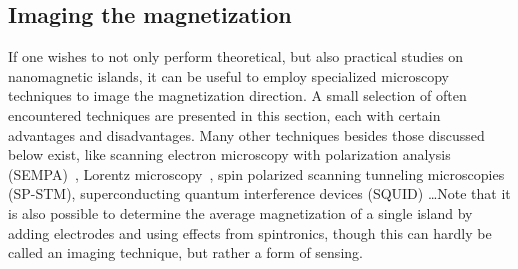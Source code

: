 \documentclass[11pt,a4paper,english]{article}
\begin{document}
\FloatBarrier
\subsection{Imaging the magnetization}
If one wishes to not only perform theoretical, but also practical studies on nanomagnetic islands, it can be useful to employ specialized microscopy techniques to image the magnetization direction. A small selection of often encountered techniques are presented in this section, each with certain advantages and disadvantages. Many other techniques besides those discussed below exist, like scanning electron microscopy with polarization analysis (SEMPA)~\cite{Imaging_SEMPA}, Lorentz microscopy~\cite{Imaging_Lorentz}, spin polarized scanning tunneling microscopies (SP-STM), superconducting quantum interference devices (SQUID) \dots Note that it is also possible to determine the average magnetization of a single island by adding electrodes and using effects from spintronics, though this can hardly be called an imaging technique, but rather a form of sensing.
\end{document}
